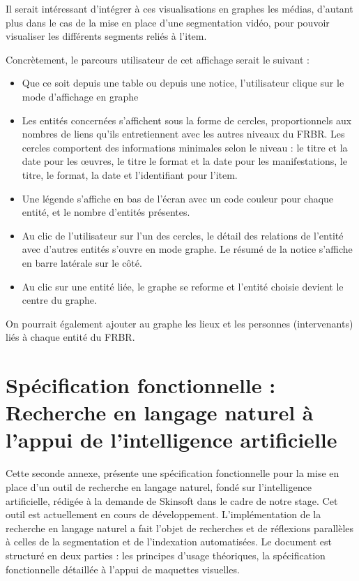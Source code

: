 Il serait intéressant d’intégrer à ces visualisations en graphes les médias, d’autant plus dans le cas de la mise en place d’une segmentation vidéo, pour pouvoir visualiser les différents segments reliés à l’\gls{item}.  

Concrètement, le parcours utilisateur de cet affichage serait le suivant :   
\begin{itemize}
	\item Que ce soit depuis une table ou depuis une notice, l’utilisateur clique sur le mode d’affichage en graphe  
	
	\item Les entités concernées s’affichent sous la forme de cercles, proportionnels aux nombres de liens qu’ils entretiennent avec les autres niveaux du \gls{FRBR}. Les cercles comportent des informations minimales selon le niveau : le titre et la date pour les œuvres, le titre le format et la date pour les \gls{manifestation}s, le titre, le format, la date et l’identifiant pour l’\gls{item}. 
	
	\item Une légende s’affiche en bas de l’écran avec un code couleur pour chaque entité, et le nombre d’entités présentes.  
	
	\item Au clic de l’utilisateur sur l’un des cercles, le détail des relations de l’entité avec d’autres entités s’ouvre en mode graphe. Le résumé de la notice s’affiche en barre latérale sur le côté.  
	
	\item Au clic sur une entité liée, le graphe se reforme et l’entité choisie devient le centre du graphe.  
\end{itemize}


On pourrait également ajouter au graphe les lieux et les personnes (intervenants) liés à chaque entité du \gls{FRBR}. 



\chapter{\label{annexe_B}Spécification fonctionnelle : Recherche en langage naturel à l’appui de l’intelligence artificielle } 

Cette seconde annexe, présente une spécification fonctionnelle pour la mise en place d'un outil de recherche en langage naturel, fondé sur l'intelligence artificielle, rédigée à la demande de Skinsoft dans le cadre de notre stage. Cet outil est actuellement en cours de développement. L'implémentation de la recherche en langage naturel a fait l'objet de recherches et de réflexions parallèles à celles de la segmentation et de l'indexation automatisées. Le document est structuré en deux parties : les principes d'usage théoriques, la spécification fonctionnelle détaillée à l'appui de maquettes visuelles. 

